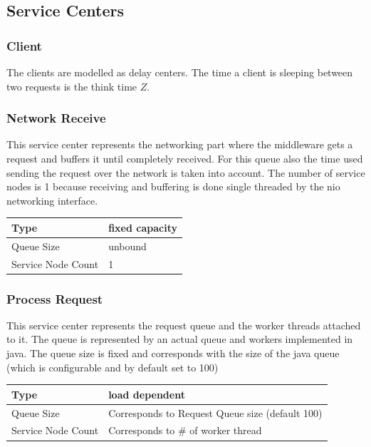 \documentclass[a4paper]{article}
\begin{document}
\subsection{Service Centers}

\subsubsection{Client}
The clients are modelled as delay centers. The time a client is sleeping between two requests is the think time $Z$.

\subsubsection{Network Receive}
\label{subsub:ServiceCenterNetworkReceive}

This service center represents the networking part where the middleware gets a request and buffers it until completely received. For this queue also the time used sending the request over the network is taken into account. The number of service nodes is 1 because receiving and buffering is done single threaded by the nio networking interface.\\

\begin{tabular}{|l|l|}
\hline 
Type & fixed capacity \\ 
\hline 
Queue Size & unbound\\ 
\hline 
Service Node Count & 1 \\ 
\hline 
\end{tabular} 

\subsubsection{Process Request}
This service center represents the request queue and the worker threads attached to it. The queue is represented by an actual queue and workers implemented in java. The queue size is fixed and corresponds with the size of the java queue (which is configurable and by default set to 100) \\

\begin{tabular}{|l|l|}
\hline 
Type & load dependent \\ 
\hline 
Queue Size & Corresponds to Request Queue size (default 100)\\ 
\hline 
Service Node Count & Corresponds to \# of worker thread \\ 
\hline 
\end{tabular} 
\end{document}
